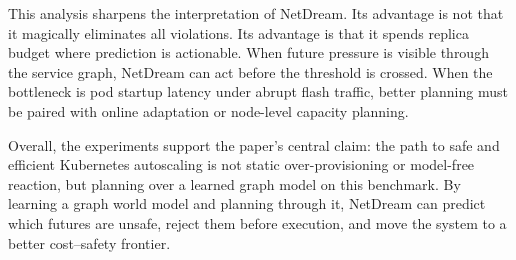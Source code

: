 This analysis sharpens the interpretation of NetDream. Its advantage is
not that it magically eliminates all violations. Its advantage is that
it spends replica budget where prediction is actionable. When future
pressure is visible through the service graph, NetDream can act before
the threshold is crossed. When the bottleneck is pod startup latency
under abrupt flash traffic, better planning must be paired with online
adaptation or node-level capacity planning.

Overall, the experiments support the paper's central claim: the path to
safe and efficient Kubernetes autoscaling is not static
over-provisioning or model-free reaction, but planning over a learned
graph model on this benchmark.
By learning a graph world model and planning through it, NetDream can
predict which futures are unsafe, reject them before execution, and move
the system to a better cost--safety frontier.